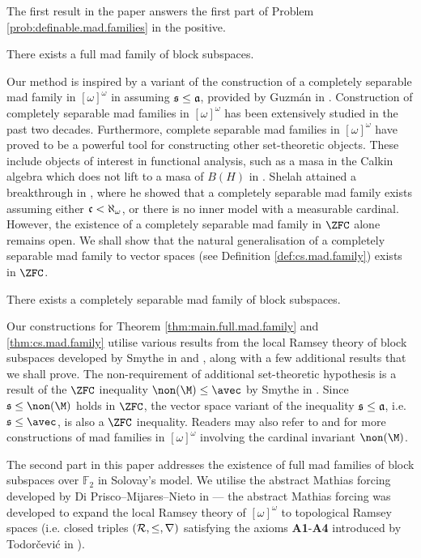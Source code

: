 \documentclass[11pt,reqno]{amsart}
\begin{document}
The first result in the paper answers the first part of Problem \ref{prob:definable.mad.families} in the positive.

\begin{theorem}
\label{thm:main.full.mad.family}
    There exists a full mad family of block subspaces.
\end{theorem}

Our method is inspired by a variant of the construction of a completely separable mad family in $[\omega]^\omega$ in \cite{MRS14} assuming $\frak{s} \leq \frak{a}$, provided by Guzm\'{a}n in \cite{G21}. Construction of completely separable mad families in $[\omega]^\omega$ has been extensively studied in the past two decades. Furthermore, complete separable mad families in $[\omega]^\omega$ have proved to be a powerful tool for constructing other set-theoretic objects. These include objects of interest in functional analysis, such as a masa in the Calkin algebra which does not lift to a masa of $B(H)$ in \cite{SS11}. Shelah attained a breakthrough in \cite{Sh11}, where he showed that a completely separable mad family exists assuming either $\frak{c} < \aleph_\omega$, or there is no inner model with a measurable cardinal. However, the existence of a completely separable mad family in $\ZFC$ alone remains open. We shall show that the natural generalisation of a completely separable mad family to vector spaces (see Definition \ref{def:cs.mad.family}) exists in $\ZFC$.

\begin{theorem}
\label{thm:cs.mad.family}
    There exists a completely separable mad family of block subspaces.
\end{theorem}

Our constructions for Theorem \ref{thm:main.full.mad.family} and \ref{thm:cs.mad.family} utilise various results from the local Ramsey theory of block subspaces developed by Smythe in \cite{S18} and \cite{S19}, along with a few additional results that we shall prove. The non-requirement of additional set-theoretic hypothesis is a result of the $\ZFC$ inequality $\non(\M) \leq \avec$ by Smythe in \cite{S19}. Since $\frak{s} \leq \non(\M)$ holds in $\ZFC$, the vector space variant of the inequality $\frak{s} \leq \frak{a}$, i.e. $\frak{s} \leq \avec$, is also a $\ZFC$ inequality. Readers may also refer to \cite{Rag09} and \cite{Rag10} for more constructions of mad families in $[\omega]^\omega$ involving the cardinal invariant $\non(\M)$. 

The second part in this paper addresses the existence of full mad families of block subspaces over $\mathbb{F}_2$ in Solovay's model. We utilise the abstract Mathias forcing developed by Di Prisco--Mijares--Nieto in \cite{DMN15} --- the abstract Mathias forcing was developed to expand the local Ramsey theory of $[\omega]^\omega$ to topological Ramsey spaces (i.e. closed triples $(\cal{R},\leq,r)$ satisfying the axioms \textbf{A1}-\textbf{A4} introduced by Todor\v{c}evi\'{c} in \cite{T10}). 
\end{document}
